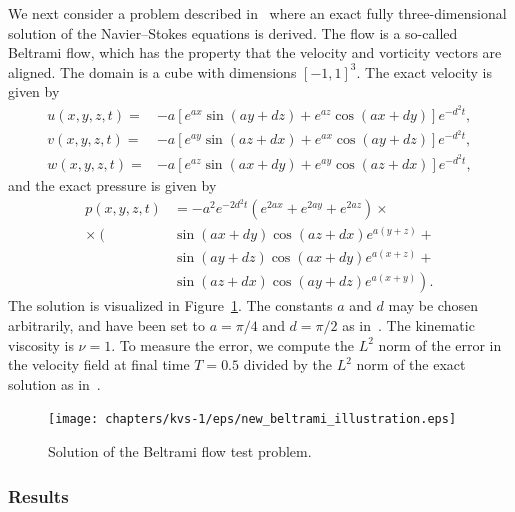 We next consider a problem described in~\cite{steinmann} where an
exact fully three-dimensional solution of the Navier--Stokes equations
is derived. The flow is a so-called Beltrami flow, which has the
property that the velocity and vorticity vectors are aligned. The
domain is a cube with dimensions $[-1,1]^3$. The exact velocity is
given by
\begin{equation*}
  \begin{split}
    u(x,y,z,t)= & -a [ e^{ax} \sin(ay + dz)  + e^{az} \cos(ax + dy) ] e^{-d^{2}t}, \\
    v(x,y,z,t)= & -a [ e^{ay} \sin(az + dx)  + e^{ax} \cos(ay + dz) ] e^{-d^{2}t}, \\
    w(x,y,z,t)= & -a [ e^{az} \sin(ax + dy)  + e^{ay} \cos(az + dx) ] e^{-d^{2}t},
  \end{split}
\end{equation*}
and the exact pressure is given by
\begin{equation*}
  \begin{split}
    p(x,y,z,t) &= - a^2 e^{-2d^{2}t}
    \left(e^{2ax} + e^{2ay} + e^{2az}\right) \times \\
    \times
    \left( \right.
    &\sin(ax + dy) \cos(az + dx) e^{a(y+z)} + \\
    &\sin(ay + dz) \cos(ax + dy) e^{a(x+z)} + \\
    &\sin(az + dx) \cos(ay + dz) e^{a(x+y)}
    \left. \right).
  \end{split}
\end{equation*}
The solution is visualized in Figure~\ref{fig:beltrami}. The constants
$a$ and $d$ may be chosen arbitrarily, and have been set to $a=\pi/4$
and $d=\pi/2$ as in~\cite{steinmann}. The kinematic viscosity is $\nu
= 1$. To measure the error, we compute the $L^2$ norm of the error in
the velocity field at final time $T = 0.5$ divided by the $L^2$ norm
of the exact solution as in~\cite{steinmann}.

\begin{figure}
  \begin{center}
    \texttt{[image: chapters/kvs-1/eps/new\_beltrami\_illustration.eps]}
    \caption{Solution of the Beltrami flow test problem.}
    \label{fig:beltrami}
  \end{center}
\end{figure}

\subsubsection{Results}

